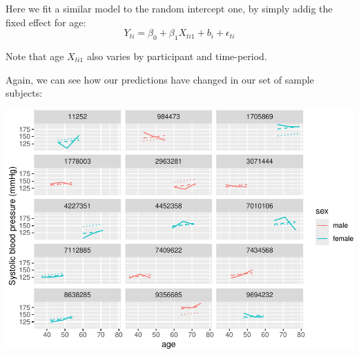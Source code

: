 \documentclass[
]{book}
\newenvironment{Shaded}{\begin{snugshade}}{\end{snugshade}}
\newcommand{\DataTypeTok}[1]{\textcolor[rgb]{0.13,0.29,0.53}{#1}}
\newcommand{\DecValTok}[1]{\textcolor[rgb]{0.00,0.00,0.81}{#1}}
\newcommand{\KeywordTok}[1]{\textcolor[rgb]{0.13,0.29,0.53}{\textbf{#1}}}
\newcommand{\NormalTok}[1]{#1}
\newcommand{\OperatorTok}[1]{\textcolor[rgb]{0.81,0.36,0.00}{\textbf{#1}}}
\newcommand{\StringTok}[1]{\textcolor[rgb]{0.31,0.60,0.02}{#1}}
\begin{document}
Here we fit a similar model to the random intercept one, by simply addig the fixed
effect for age:
\[
Y_{ti} = \beta_{0} + \beta_{1}X_{ti1} + b_{i} + \epsilon_{ti}
\]

Note that age \(X_{ti1}\) also varies by participant and time-period.

Again, we can see how our predictions have changed in our set of sample
subjects:

\begin{Shaded}
\end{Shaded}

\includegraphics{adv_epi_analysis_files/figure-latex/unnamed-chunk-297-1.pdf}
\end{document}
